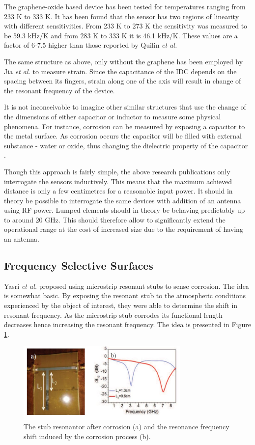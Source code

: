 \documentclass[11pt,a4paper]{article}
\begin{document}
The graphene-oxide based device has been tested for temperatures ranging from 233 K to 333 K. It has been found that the sensor has two regions of linearity with different sensitivities. From 233 K to 273 K the sensitivity was measured to be 59.3 kHz/K and from 283 K to 333 K it is 46.1 kHz/K. These values are a factor of 6-7.5 higher than those reported by Quilin \textit{et al.}

The same structure as above, only without the graphene  has been employed by Jia \textit{et al.} \cite{IDC} to measure strain. Since the capacitance of the IDC depends on the spacing between its fingers, strain along one of the axis will result in change of the resonant frequency of the device. 

It is not inconceivable to imagine other similar structures that use the change of the dimensions of either capacitor or inductor to measure some physical phenomena. For instance, corrosion can be measured by exposing a capacitor to the metal surface. As corrosion occurs the capacitor will be filled with external substance - water or oxide, thus changing the dielectric property of the capacitor \cite{corrosion}.

Though this approach is fairly simple, the above research publications only interrogate the sensors inductively. This means that the maximum achieved distance is only a few centimetres for a reasonable input power. It should in theory be possible to interrogate the same devices with addition of an antenna using RF power. Lumped elements should in theory be behaving predictably up to around 20 GHz. This should therefore allow to significantly extend the operational range at the cost of increased size due to the requirement of having an antenna.

\subsection{Frequency Selective Surfaces}

Yasri \textit{et al.} \cite{corrosion2} proposed using microstrip resonant stubs to sense corrosion. The idea is somewhat basic. By exposing the resonant stub to the atmospheric conditions experienced by the object of interest, they were able to determine the shift in resonant frequency. As the microstrip stub corrodes its functional length decreases hence increasing the resonant frequency. The idea is presented in Figure \ref{fig:stub}.

\begin{figure}[h]
\centering
\includegraphics[width=0.75\textwidth]{stub.JPG}
\caption{The stub resonantor after corrosion (a) and the resonance frequency shift induced by the corrosion process (b).\cite{corrosion2}\label{fig:stub}}
\end{figure}
\end{document}
